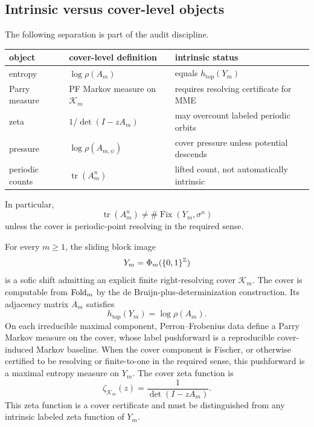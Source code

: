 \subsection{Intrinsic versus cover-level objects}

The following separation is part of the audit discipline.
\begin{center}
\begin{tabular}{lll}
\toprule
object & cover-level definition & intrinsic status\\
\midrule
entropy & \(\log\rho(A_m)\) & equals \(h_{\mathrm{top}}(Y_m)\)\\
Parry measure & PF Markov measure on \(\mathcal K_m\) & requires resolving certificate for MME\\
zeta & \(1/\det(I-zA_m)\) & may overcount labeled periodic orbits\\
pressure & \(\log\rho(A_{m,\psi})\) & cover pressure unless potential descends\\
periodic counts & \(\operatorname{tr}(A_m^n)\) & lifted count, not automatically intrinsic\\
\bottomrule
\end{tabular}
\end{center}
In particular,
\[
\operatorname{tr}(A_m^n)
\neq
\#\operatorname{Fix}(Y_m,\sigma^n)
\]
unless the cover is periodic-point resolving in the required sense.

\begin{theorem}
\label{thm:finite-state-audit}
For every \(m\ge1\), the sliding block image
\[
Y_m=\Phi_m(\{0,1\}^{\mathbb{Z}})
\]
is a sofic shift admitting an explicit finite right-resolving cover \(\mathcal K_m\).  The cover is computable from \(\operatorname{Fold}_m\) by the de Bruijn-plus-determinization construction.  Its adjacency matrix \(A_m\) satisfies
\[
h_{\mathrm{top}}(Y_m)=\log\rho(A_m).
\]
On each irreducible maximal component, Perron--Frobenius data define a Parry Markov measure on the cover, whose label pushforward is a reproducible cover-induced Markov baseline.  When the cover component is Fischer, or otherwise certified to be resolving or finite-to-one in the required sense, this pushforward is a maximal entropy measure on \(Y_m\).  The cover zeta function is
\[
\zeta_{\mathcal K_m}(z)=\frac1{\det(I-zA_m)}.
\]
This zeta function is a cover certificate and must be distinguished from any intrinsic labeled zeta function of \(Y_m\).
\end{theorem}

